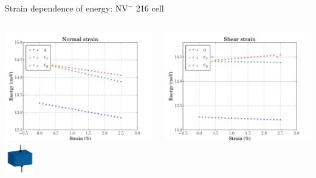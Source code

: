 \documentclass[notes=hide]{beamer}
\begin{document}
\begin{frame}{Strain dependence of energy: $ \mathrm{NV}^{-} $ 216 cell}
  \centering
  \begin{columns}
    \begin{column}{0.5\textwidth}
      \centering
      \includegraphics[width=1\textwidth]{images/strain/vasp-216-normal-relaxed.pdf}\\
      \includegraphics[width=0.2\textwidth]{images/strain/normal-strain.pdf}
    \end{column}
    \begin{column}{0.5\textwidth}
      \centering
      \includegraphics[width=1\textwidth]{images/strain/vasp-216-shear-relaxed.pdf}\\

\end{column}
\end{columns}
\end{frame}
\end{document}
